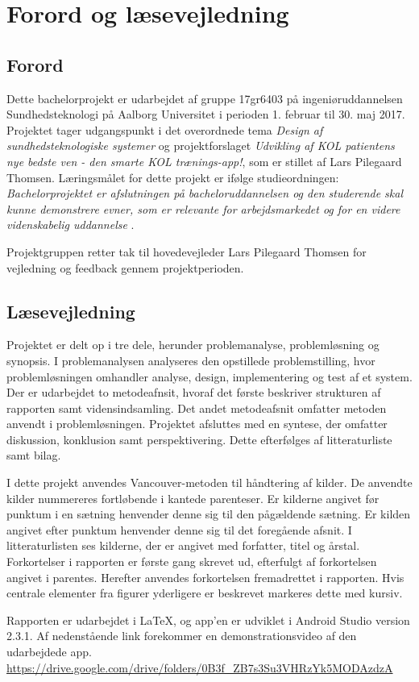 \chapter*{Forord og læsevejledning}

\section*{Forord}
Dette bachelorprojekt er udarbejdet af gruppe 17gr6403 på ingeniøruddannelsen Sundhedsteknologi på Aalborg Universitet i perioden 1. februar til 30. maj 2017. Projektet tager udgangspunkt i det overordnede tema \textit{Design af sundhedsteknologiske systemer} og projektforslaget \textit{Udvikling af KOL patientens nye bedste ven - den smarte KOL trænings-app!}, som er stillet af Lars Pilegaard Thomsen. 
Læringsmålet for dette projekt er ifølge studieordningen: \textit{Bachelorprojektet er afslutningen på bacheloruddannelsen og den studerende skal kunne demonstrere evner, som er relevante for arbejdsmarkedet og for en videre videnskabelig uddannelse} \cite{Studieordning2014}.

Projektgruppen retter tak til hovedevejleder Lars Pilegaard Thomsen for vejledning og feedback gennem projektperioden.

\section*{Læsevejledning}
Projektet er delt op i tre dele, herunder problemanalyse, problemløsning og synopsis. I problemanalysen analyseres den opstillede problemstilling, hvor problemløsningen omhandler analyse, design, implementering og test af et system. Der er udarbejdet to metodeafnsit, hvoraf det første beskriver strukturen af rapporten samt vidensindsamling. Det andet metodeafsnit omfatter metoden anvendt i problemløsningen. Projektet afsluttes med en syntese, der omfatter diskussion, konklusion samt perspektivering. Dette efterfølges af litteraturliste samt bilag. 

I dette projekt anvendes Vancouver-metoden til håndtering af kilder. De anvendte kilder nummereres fortløbende i kantede parenteser. Er kilderne angivet før punktum i en sætning henvender denne sig til den pågældende sætning. Er kilden angivet efter punktum henvender denne sig til det foregående afsnit. I litteraturlisten ses kilderne, der er angivet med forfatter, titel og årstal. Forkortelser i rapporten er første gang skrevet ud, efterfulgt af forkortelsen angivet i parentes. Herefter anvendes forkortelsen fremadrettet i rapporten. Hvis centrale elementer fra figurer yderligere er beskrevet markeres dette med kursiv. 

Rapporten er udarbejdet i \LaTeX, og app'en er udviklet i Android Studio version 2.3.1.
Af nedenstående link forekommer en demonstrationsvideo af den udarbejdede app. \newline
\url{https://drive.google.com/drive/folders/0B3f_ZB7s3Su3VHRzYk5MODAzdzA}